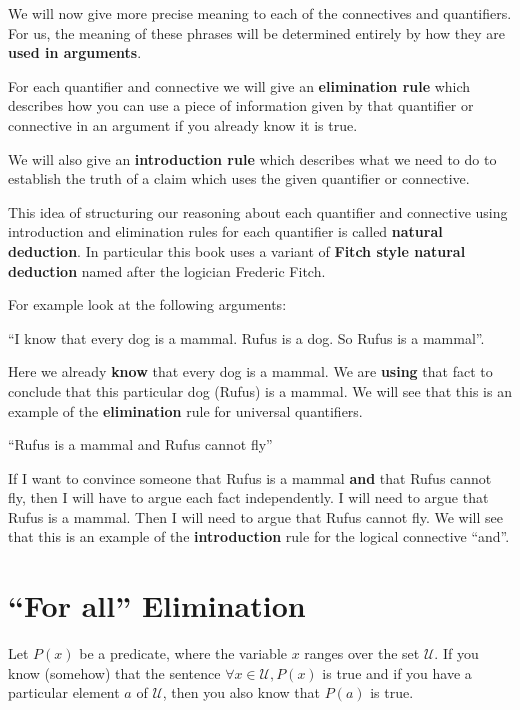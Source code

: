 We will now give more precise meaning to each of the connectives and quantifiers.  For us, the meaning of these phrases will be determined entirely by how they are \textbf{used in arguments}.

For each quantifier and connective we will give an  \textbf{elimination rule} which describes how you can use a piece of information given by that quantifier or connective in an argument if you already know it is true.

We will also give an  \textbf{introduction rule} which describes what we need to do to establish the truth of a claim which uses the given quantifier or connective.

This idea of structuring our reasoning about each quantifier and connective using introduction and elimination rules for each quantifier is called  \textbf{natural deduction}.  In particular this book uses a variant of  \textbf{Fitch style natural deduction} named after the logician Frederic Fitch.

For example look at the following arguments:

``I know that every dog is a mammal.  Rufus is a dog.  So Rufus is a mammal''.

Here we already \textbf{know} that every dog is a mammal.  We are \textbf{using} that fact to conclude that this particular dog (Rufus) is a mammal.  We will see that this is an example of the \textbf{elimination} rule for universal quantifiers.

``Rufus is a mammal and Rufus cannot fly''

If I want to convince someone that Rufus is a mammal \textbf{and} that Rufus cannot fly, then I will have to argue each fact independently.  I will need to argue that Rufus is a mammal.  Then I will need to argue that Rufus cannot fly.  We will see that this is an example of the \textbf{introduction} rule for the logical connective ``and''.

\section{``For all'' Elimination}

Let $P(x)$ be a predicate, where the variable $x$ ranges over the set $\mathcal{U}$.  If you know (somehow) that the sentence $\forall x \in \mathcal{U}, P(x)$ is true and if you have a particular element $a$ of $\mathcal{U}$, then you also know that $P(a)$ is true. 

